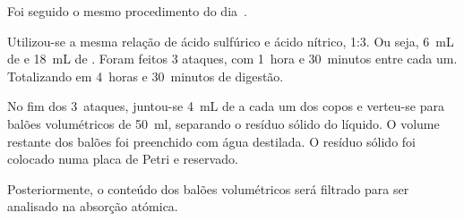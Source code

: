 Foi seguido o mesmo procedimento do dia~.

Utilizou-se a mesma relação de ácido sulfúrico e ácido nítrico, 1:3.
Ou seja, 6~mL de  e 18~mL de .
Foram feitos 3 ataques, com 1~hora e 30~minutos entre cada um.
Totalizando em 4~horas e 30~minutos de digestão.

No fim dos 3~ataques, juntou-se 4~mL de  a cada um dos copos e verteu-se para balões volumétricos de 50~ml, separando o resíduo sólido do líquido.
O volume restante dos balões foi preenchido com água destilada.
O resíduo sólido foi colocado numa placa de Petri e reservado.

Posteriormente, o conteúdo dos balões volumétricos será filtrado para ser analisado na absorção atómica.

\hrulefill